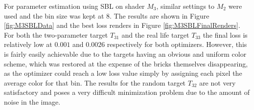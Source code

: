 For parameter estimation using SBL on shader $M_3$, similar settings to $M_2$ were used and the bin size was kept at 8. The results are shown in Figure \ref{fig:M3SBLData} and the best loss renders in Figure \ref{fig:M3SBLFinalRenders}. For both the two-parameter target $T_{31}$ and the real life target $T_{33}$ the final loss is relatively low at $0.001$ and $0.0026$ respectively for both optimizers. However, this is fairly easily achievable due to the targets having an obvious and uniform color scheme, which was restored at the expense of the bricks themselves disappearing, as the optimizer could reach a low loss value simply by assigning each pixel the average color for that bin. The results for the random target $T_{32}$ are not very satisfactory and poses a very difficult minimization problem due to the amount of noise in the image. 

